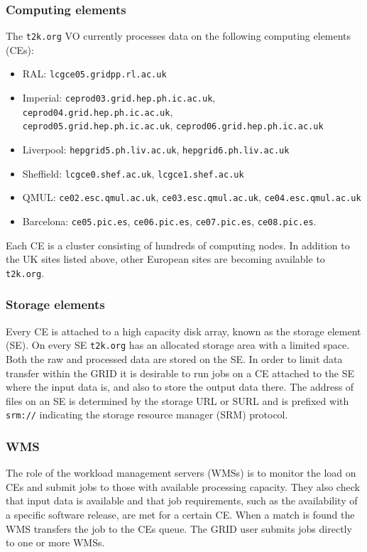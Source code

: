 \documentclass[11pt]{article}
\begin{document}
\subsubsection*{Computing elements}
The \verb+t2k.org+ VO currently processes data on the following
computing elements (CEs):
\begin{itemize}
\item RAL: \verb+lcgce05.gridpp.rl.ac.uk+
\item Imperial: \verb+ceprod03.grid.hep.ph.ic.ac.uk+,
  \verb+ceprod04.grid.hep.ph.ic.ac.uk+,\\
  \verb+ceprod05.grid.hep.ph.ic.ac.uk+,
  \verb+ceprod06.grid.hep.ph.ic.ac.uk+
\item Liverpool: \verb+hepgrid5.ph.liv.ac.uk+, \verb+hepgrid6.ph.liv.ac.uk+
\item Sheffield: \verb+lcgce0.shef.ac.uk+, \verb+lcgce1.shef.ac.uk+
\item QMUL: \verb+ce02.esc.qmul.ac.uk+, \verb+ce03.esc.qmul.ac.uk+,
  \verb+ce04.esc.qmul.ac.uk+
\item Barcelona: \verb+ce05.pic.es+, \verb+ce06.pic.es+, \verb+ce07.pic.es+, \verb+ce08.pic.es+.
\end{itemize}
Each CE is a cluster consisting of hundreds of computing nodes. In
addition to the UK sites listed above, other European sites are
becoming available to \verb+t2k.org+.

\subsubsection*{Storage elements}
Every CE is attached to a high capacity disk array, known as the
storage element (SE). On every SE \verb+t2k.org+ has an allocated
storage area with a limited space. Both the raw and processed data are
stored on the SE. In order to limit data transfer within the GRID it
is desirable to run jobs on a CE attached to the SE where the input
data is, and also to store the output data there. The address of files
on an SE is determined by the storage URL or SURL and is prefixed with
\verb+srm://+ indicating the storage resource manager (SRM) protocol.

\subsubsection*{WMS}
The role of the workload management servers (WMSs) is to monitor the
load on CEs and submit jobs to those with available processing
capacity. They also check that input data is available and that job
requirements, such as the availability of a specific software release,
are met for a certain CE. When a match is found the WMS transfers the job
to the CEs queue. The GRID user submits jobs directly to one or more WMSs.
\end{document}
